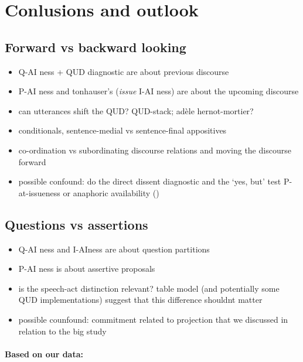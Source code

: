 \documentclass[12pt]{article}
\begin{document}
\section{Conlusions and outlook}

  \subsection{Forward vs backward looking} %
    \begin{itemize}
      \item Q-AI ness + QUD diagnostic are about previous discourse
      \item P-AI ness and tonhauser's (\emph{issue} I-AI ness) are about the upcoming discourse
      \item can utterances shift the QUD? QUD-stack; adèle hernot-mortier?
      \item conditionals, sentence-medial vs sentence-final appositives
      \item co-ordination vs subordinating discourse relations and moving the discourse forward 
      \item possible confound: do the direct dissent diagnostic and the `yes, but' test P-at-issueness or anaphoric availability (\cite{snider_distinguishing_2018})
    \end{itemize}  
  

  \subsection{Questions vs assertions} %
      \begin{itemize}
        \item Q-AI ness and I-AIness are about question partitions
        \item P-AI ness is about assertive proposals
        \item is the speech-act distinction relevant? table model (and potentially some QUD implementations) suggest that this difference shouldnt matter
        \item possible counfound: commitment related to projection that we discussed in relation to the big study
      \end{itemize}
      
      \paragraph{Based on our data:} %
      
\end{document}
